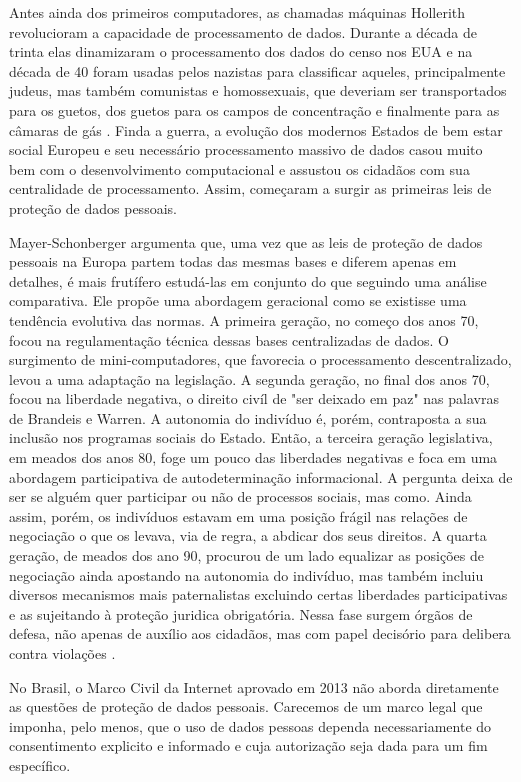 Antes ainda dos primeiros computadores, as chamadas máquinas Hollerith revolucioram a capacidade de processamento de dados.
Durante a década de trinta elas dinamizaram o processamento dos dados do censo nos EUA e na década de 40 foram usadas pelos nazistas para classificar aqueles, principalmente judeus, mas também comunistas e homossexuais, que deveriam ser transportados para os guetos, dos guetos para os campos de concentração e finalmente para as câmaras de gás \cite{Black01}.
Finda a guerra, a evolução dos modernos Estados de bem estar social Europeu e seu necessário processamento massivo de dados casou muito bem com o desenvolvimento computacional e assustou os cidadãos com sua centralidade de processamento.
Assim, começaram a surgir as primeiras leis de proteção de dados pessoais.

Mayer-Schonberger argumenta que, uma vez que as leis de proteção de dados pessoais na Europa partem todas das mesmas bases e diferem apenas em detalhes, é mais frutífero estudá-las em conjunto do que seguindo uma análise comparativa.
Ele propõe uma abordagem geracional como se existisse uma tendência evolutiva das normas.
A primeira geração, no começo dos anos 70, focou na regulamentação técnica dessas bases centralizadas de dados.
O surgimento de mini-computadores, que favorecia o processamento descentralizado, levou a uma adaptação na legislação.
A segunda geração, no final dos anos 70, focou na liberdade negativa, o direito civíl de "ser deixado em paz" nas palavras de Brandeis e Warren.
A autonomia do indivíduo é, porém, contraposta a sua inclusão nos programas sociais do Estado.
Então, a terceira geração legislativa, em meados dos anos 80, foge um pouco das liberdades negativas e foca em uma abordagem participativa de autodeterminação informacional.
A pergunta deixa de ser se alguém quer participar ou não de processos sociais, mas como.
Ainda assim, porém, os indivíduos estavam em uma posição frágil nas relações de negociação o que os levava, via de regra, a abdicar dos seus direitos.
A quarta geração, de meados dos ano 90, procurou de um lado equalizar as posições de negociação ainda apostando na autonomia do indivíduo, mas também incluiu diversos mecanismos mais paternalistas excluindo certas liberdades participativas e as sujeitando à proteção juridica obrigatória.
Nessa fase surgem órgãos de defesa, não apenas de auxílio aos cidadãos, mas com papel decisório para delibera contra violações \cite{Mayer-Schonberger97}.

No Brasil, o Marco Civil da Internet aprovado em 2013 não aborda diretamente as questões de proteção de dados pessoais.
Carecemos de um marco legal que imponha, pelo menos, que o uso de dados pessoas dependa necessariamente do consentimento explicito e informado e cuja autorização seja dada para um fim específico.


